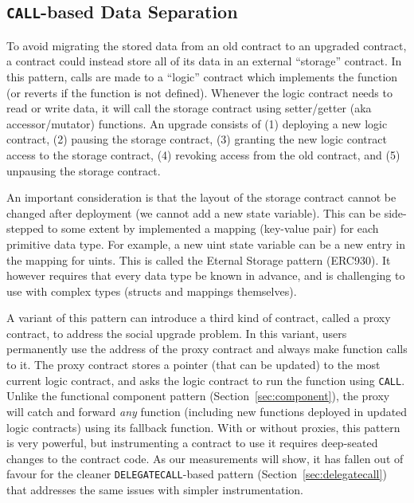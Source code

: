 
\subsection{\texttt{CALL}-based Data Separation}
\label{sec:callbased}

To avoid migrating the stored data from an old contract to an upgraded contract, a contract could instead store all of its data in an external ``storage'' contract. In this pattern, calls are made to a ``logic'' contract which implements the function (or reverts if the function is not defined). Whenever the logic contract needs to read or write data, it will call the storage contract using setter/getter (aka accessor/mutator) functions. An upgrade consists of (1) deploying a new logic contract, (2) pausing the storage contract, (3) granting the new logic contract access to the storage contract, (4) revoking access from the old contract, and (5) unpausing the storage contract. 

An important consideration is that the layout of the storage contract cannot be changed after deployment (\eg we cannot add a new state variable). This can be side-stepped to some extent by implemented a mapping (key-value pair) for each primitive data type. For example, a new uint state variable can be a new entry in the mapping for uints. This is called the Eternal Storage pattern (ERC930). It however requires that every data type be known in advance, and is challenging to use with complex types (\eg structs and mappings themselves).

A variant of this pattern can introduce a third kind of contract, called a proxy contract, to address the social upgrade problem. In this variant, users permanently use the address of the proxy contract and always make function calls to it. The proxy contract stores a pointer (that can be updated) to the most current logic contract, and asks the logic contract to run the function using \texttt{CALL}. Unlike the functional component pattern (Section~\ref{sec:component}), the proxy will catch and forward \textit{any} function (including new functions deployed in updated logic contracts) using its fallback function.  With or without proxies, this pattern is very powerful, but instrumenting a contract to use it requires deep-seated changes to the contract code. As our measurements will show, it has fallen out of favour for the cleaner \texttt{DELEGATECALL}-based pattern (Section~\ref{sec:delegatecall}) that addresses the same issues with simpler instrumentation. 

